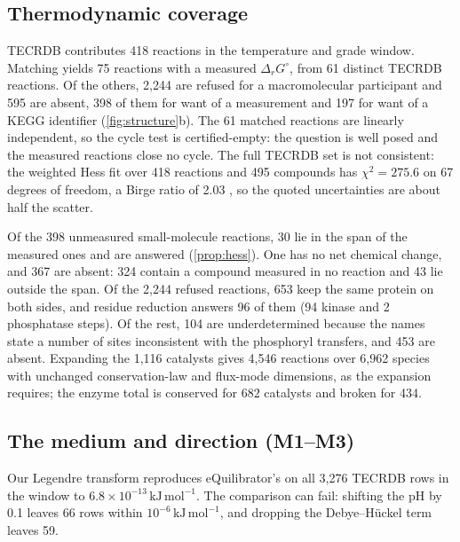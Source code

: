 \documentclass[5p]{elsarticle}
\theoremstyle{definition}
\theoremstyle{plain}
\newcommand{\kJ}{\ensuremath{\,\mathrm{kJ\,mol^{-1}}}}
\newcommand{\DG}{\ensuremath{\Delta_r G^\circ}}
\newcommand{\st}[1]{\textsf{#1}}            %
\begin{document}
\subsection{Thermodynamic coverage}
\label{sec:res-thermo}

TECRDB contributes 418 reactions in the temperature and grade window.
Matching yields 75 reactions with a measured \DG, from 61 distinct TECRDB reactions.
Of the others, 2{,}244 are \st{refused} for a macromolecular participant and 595 are \st{absent}, 398 of them for want of a measurement and 197 for want of a KEGG identifier (\cref{fig:structure}b).
The 61 matched reactions are linearly independent, so the cycle test is \st{certified-empty}: the question is well posed and the measured reactions close no cycle.
The full TECRDB set is not consistent: the weighted Hess fit over 418 reactions and 495 compounds has $\chi^2=275.6$ on 67 degrees of freedom, a Birge ratio of 2.03 \citep{birge1932calculation}, so the quoted uncertainties are about half the scatter.

Of the 398 unmeasured small-molecule reactions, 30 lie in the span of the measured ones and are \st{answered} (\cref{prop:hess}).
One has no net chemical change, and 367 are \st{absent}: 324 contain a compound measured in no reaction and 43 lie outside the span.
Of the 2{,}244 refused reactions, 653 keep the same protein on both sides, and residue reduction answers 96 of them (94 kinase and 2 phosphatase steps).
Of the rest, 104 are \st{underdetermined} because the names state a number of sites inconsistent with the phosphoryl transfers, and 453 are \st{absent}.
Expanding the 1{,}116 catalysts gives 4{,}546 reactions over 6{,}962 species with unchanged conservation-law and flux-mode dimensions, as the expansion requires; the enzyme total is conserved for 682 catalysts and broken for 434.

\subsection{The medium and direction (M1--M3)}
\label{sec:res-medium}

Our Legendre transform reproduces eQuilibrator's on all 3{,}276 TECRDB rows in the window to $6.8\times10^{-13}\kJ$.
The comparison can fail: shifting the pH by 0.1 leaves 66 rows within $10^{-6}\kJ$, and dropping the Debye--H\"uckel term leaves 59.
\end{document}
